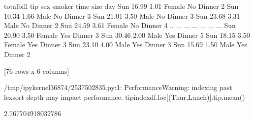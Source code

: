 \documentclass[letterpaper,10pt,english]{jupyterBook}
\begin{document}
\begin{sphinxVerbatim}[commandchars=\\\{\}]
     total\PYGZus{}bill   tip     sex smoker    time  size
day                                               
Sun       16.99  1.01  Female     No  Dinner     2
Sun       10.34  1.66    Male     No  Dinner     3
Sun       21.01  3.50    Male     No  Dinner     3
Sun       23.68  3.31    Male     No  Dinner     2
Sun       24.59  3.61  Female     No  Dinner     4
..          ...   ...     ...    ...     ...   ...
Sun       20.90  3.50  Female    Yes  Dinner     3
Sun       30.46  2.00    Male    Yes  Dinner     5
Sun       18.15  3.50  Female    Yes  Dinner     3
Sun       23.10  4.00    Male    Yes  Dinner     3
Sun       15.69  1.50    Male    Yes  Dinner     2

[76 rows x 6 columns]
\end{sphinxVerbatim}

\begin{sphinxVerbatim}[commandchars=\\\{\}]
  \PYG{p}{[}\PYG{p}{]}
\end{sphinxVerbatim}

\begin{sphinxVerbatim}[commandchars=\\\{\}]
\PYG{p}{[}\PYG{p}{]}
\end{sphinxVerbatim}

\begin{sphinxVerbatim}[commandchars=\\\{\}]
/tmp/ipykernel\PYGZus{}36874/2537502835.py:1: PerformanceWarning: indexing past lexsort depth may impact performance.
  tip\PYGZus{}index\PYGZus{}df.loc[(\PYGZsq{}Thur\PYGZsq{},\PYGZsq{}Lunch\PYGZsq{})].tip.mean()
\end{sphinxVerbatim}

\begin{sphinxVerbatim}[commandchars=\\\{\}]
2.767704918032786
\end{sphinxVerbatim}
\end{document}
